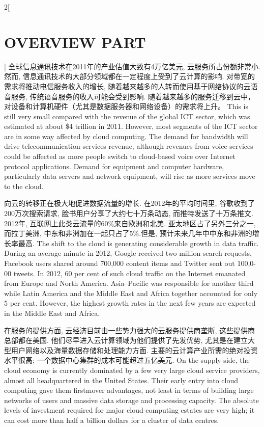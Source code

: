 \documentclass[a4paper, UTF8, 12pt]{article}
\begin{document}
\begin{paracol}{2}[\section{OVERVIEW PART\uppercase\expandafter{}}]
    \switchcolumn*
    全球信息通讯技术在2011年的产业估值大致有4万亿美元, 云服务所占份额非常小. 然而, 信息通讯技术的大部分领域都在一定程度上受到了云计算的影响. 对带宽的需求将推动电信服务收入的增长, 随着越来越多的人转而使用基于网络协议的云语音服务, 传统语音服务的收入可能会受到影响. 随着越来越多的服务迁移到云中，对设备和计算机硬件（尤其是数据服务器和网络设备）的需求将上升。
    \switchcolumn
    This is still very small compared with the revenue of the global ICT sector, which was estimated at about \$4 trillion in 2011. However, most segments of the ICT sector are in some way affected by cloud computing. The demand for bandwidth will drive telecommunication services revenue, although revenues from voice services could be affected as more people switch to cloud-based voice over Internet protocol applications. Demand for equipment and computer hardware, particularly data servers and network equipment, will rise as more services move to the cloud. 

    \switchcolumn*
    向云的转移正在极大地促进数据流量的增长. 在2012年的平均时间里, 谷歌收到了200万次搜索请求, 脸书用户分享了大约七十万条动态, 而推特发送了十万条推文. 2012年, 互联网上此类云流量的60\%来自欧洲和北美. 亚太地区占了另外三分之一, 而拉丁美洲, 中东和非洲加在一起只占了5\%.但是, 预计未来几年中中东和非洲的增长率最高.
    \switchcolumn
    The shift to the cloud is generating considerable growth in data traffic. During an average minute in 2012, Google received two million search requests, Facebook users shared around 700,000 content items and Twitter sent out 100,0-00 tweets. In 2012, 60 per cent of such cloud traffic on the Internet emanated from Europe and North America. Asia–Pacific was responsible for another third while Latin America and the Middle East and Africa together accounted for only 5 per cent. However, the highest growth rates in the next few years are expected in the Middle East and Africa. 

    \switchcolumn*
    在服务的提供方面, 云经济目前由一些势力强大的云服务提供商垄断, 这些提供商总部都在美国. 他们尽早进入云计算领域为他们提供了先发优势, 尤其是在建立大型用户网络以及海量数据存储和处理能力方面. 主要的云计算产业所需的绝对投资水平很高; 一个数据中心集群的成本可能超过五亿美元.
    \switchcolumn
    On the supply side, the cloud economy is currently dominated by a few very large cloud service providers, almost all headquartered in the United States. Their early entry into cloud computing gave them firstmover advantages, not least in terms of building large networks of users and massive data storage and processing capacity. The absolute levels of investment required for major cloud-computing estates are very high; it can cost more than half a billion dollars for a cluster of data centres.


\end{paracol}
\end{document}
